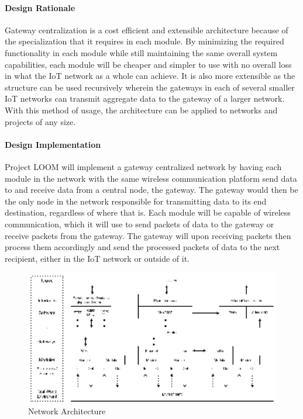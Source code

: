 \documentclass[onecolumn, draftclsnofoot,10pt, compsoc]{IEEEtran}
\begin{document}
\paragraph{Design Rationale}
    Gateway centralization is a cost efficient and extensible architecture because of the specialization that it requires in each module. By minimizing the required functionality in each module while still maintaining the same overall system capabilities, each module will be cheaper and simpler to use with no overall loss in what the IoT network as a whole can achieve. It is also more extensible as the structure can be used recursively wherein the gateways in each of several smaller IoT networks can transmit aggregate data to the gateway of a larger network. With this method of usage, the architecture can be applied to networks and projects of any size.

\paragraph{Design Implementation}
    Project LOOM will implement a gateway centralized network by having each module in the network with the same wireless communication platform send data to and receive data from a central node, the gateway. The gateway would then be the only node in the network responsible for transmitting data to its end destination, regardless of where that is. Each module will be capable of wireless communication, which it will use to send packets of data to the gateway or receive packets from the gateway. The gateway will upon receiving packets then process them accordingly and send the processed packets of data to the next recipient, either in the IoT network or outside of it. 

    \begin{figure}[H]
        \centering
        \caption{Network Architecture}
        \label{fig:network_architecture}
        \includegraphics[width=16cm]{network_architecture.eps}         
     \end{figure}
\end{document}
